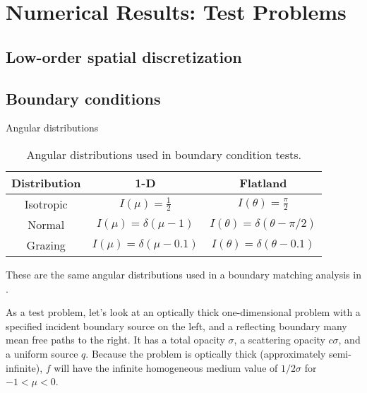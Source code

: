 
\chapter{Numerical Results: Test Problems}


\section{Low-order spatial discretization}

\section{Boundary conditions}

Angular distributions

\begin{table}[htb]
  \centering
  \begin{tabular}{ccc}
\toprule
    Distribution & 1-D & Flatland
\\ \midrule
Isotropic & $I(\mu) = \frac{1}{2}$ & $I(\theta) = \frac{\pi}{2}$
\\
Normal & $I(\mu) = \delta(\mu-1)$ & $I(\theta) = \delta(\theta-\pi/2)$
\\
Grazing & $I(\mu) = \delta(\mu-0.1)$ & $I(\theta) = \delta(\theta-0.1)$
\\ \bottomrule
  \end{tabular}
  \caption{Angular distributions used in boundary condition tests.}
  \label{tab:angularDistributions}
\end{table}

These are the same angular distributions used in a boundary matching analysis
in \cite{Dav2006}.

\horizsep

As a test problem, let's look at an optically thick one-dimensional problem
with a specified incident boundary source on the left, and a reflecting
boundary many mean free paths to the right. It has a total opacity $\sigma$, a
scattering opacity $c\sigma$, and a uniform source $q$. Because the problem is
optically thick (approximately semi-infinite), $f$ will have the infinite
homogeneous medium value of $1/2\sigma$ for $-1 < \mu < 0$.

